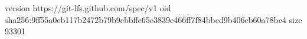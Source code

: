 version https://git-lfs.github.com/spec/v1
oid sha256:9ff55a0eb117b2472b79b9ebbffe65e3839e466ff7f84bbcd9b406cb60a78bc4
size 93301
